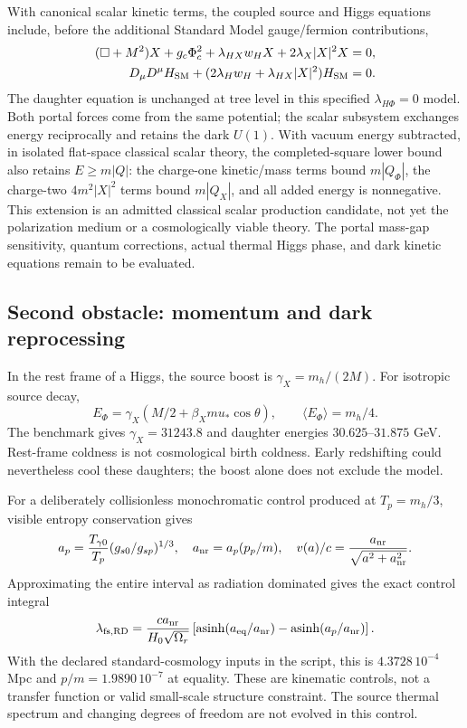 \documentclass[11pt]{article}
\begin{document}
With canonical scalar kinetic terms, the coupled source and Higgs equations
include, before the additional Standard Model gauge/fermion contributions,
\begin{align}
 (\Box+M^2)X+g_c\Phi_c^2+
 \lambda_{HX}w_H X+2\lambda_X|X|^2X&=0,\\
 D_\mu D^\mu H_{\rm SM}+
 (2\lambda_Hw_H+\lambda_{HX}|X|^2)H_{\rm SM}&=0.
\end{align}
The daughter equation is unchanged at tree level in this specified
$\lambda_{H\Phi}=0$ model. Both portal forces come from the same potential;
the scalar subsystem exchanges energy reciprocally and retains the dark
$U(1)$. With vacuum energy subtracted, in isolated flat-space classical
scalar theory, the completed-square lower bound also retains $E\ge m|Q|$:
the charge-one kinetic/mass terms bound $m|Q_\Phi|$, the charge-two
$4m^2|X|^2$ terms bound $m|Q_X|$, and all added energy is nonnegative.
This extension is an admitted classical scalar production candidate, not
yet the polarization medium or a cosmologically viable theory. The portal
mass-gap sensitivity, quantum corrections, actual thermal Higgs phase,
and dark kinetic equations remain to be evaluated.

\subsection{Second obstacle: momentum and dark reprocessing}
In the rest frame of a Higgs, the source boost is $\gamma_X=m_h/(2M)$.
For isotropic source decay,
\begin{equation}
 E_\Phi=\gamma_X(M/2+\beta_X m u_*\cos\theta),\qquad
 \langle E_\Phi\rangle=m_h/4.
\end{equation}
The benchmark gives $\gamma_X=31243.8$ and daughter energies
$30.625$--$31.875$ GeV. Rest-frame coldness is not cosmological birth coldness.
Early redshifting could nevertheless cool these daughters; the boost alone
does not exclude the model.

For a deliberately collisionless monochromatic control produced at
$T_p=m_h/3$, visible entropy conservation gives
\begin{equation}
 a_p=\frac{T_{\gamma0}}{T_p}(g_{s0}/g_{sp})^{1/3},\quad
 a_{\rm nr}=a_p(p_p/m),\quad
 v(a)/c=\frac{a_{\rm nr}}{\sqrt{a^2+a_{\rm nr}^2}}.
\end{equation}
Approximating the entire interval as radiation dominated gives the exact
control integral
\begin{equation}
 \lambda_{\rm fs,RD}=\frac{c a_{\rm nr}}{H_0\sqrt{\Omega_r}}
 \left[\operatorname{asinh}(a_{\rm eq}/a_{\rm nr})
 -\operatorname{asinh}(a_p/a_{\rm nr})\right].
\end{equation}
With the declared standard-cosmology inputs in the script, this is
$4.3728\,10^{-4}$ Mpc and $p/m=1.9890\,10^{-7}$ at equality.
These are kinematic controls, not a transfer function or valid small-scale
structure constraint. The source thermal spectrum and changing degrees of
freedom are not evolved in this control.
\end{document}
